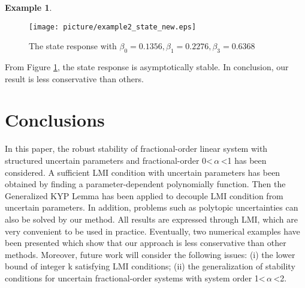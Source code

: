 \documentclass[]{interact}
\theoremstyle{plain}%
\theoremstyle{definition}
\newtheorem{example}[theorem]{Example}
\theoremstyle{remark}
\begin{document}
\begin{example}
    \begin{figure}[H]
    	\centering
    	\texttt{[image: picture/example2\_state\_new.eps]}
    	\caption{The state response with $\beta_0 = 0.1356, \beta_1 = 0.2276, \beta_3 = 0.6368$} 
    	\label{example2_state} 
    \end{figure}
    \par From Figure \ref{example2_state}, the state response is asymptotically stable. In conclusion, our result is less conservative than others.
\end{example}
\section{Conclusions}
\par In this paper, the robust stability of fractional-order linear system with structured uncertain parameters and fractional-order 0\textless\,$\alpha$\,\textless1 has been considered. A sufficient LMI condition with uncertain parameters has been obtained by finding a parameter-dependent polynomially function. Then the Generalized KYP Lemma has been applied to decouple LMI condition from uncertain parameters. In addition, problems such as polytopic uncertainties can also be solved by our method. All results are expressed through LMI, which are very convenient to be used in practice. Eventually, two numerical examples have been presented which show that our approach is less conservative than other methods. Moreover, future work will consider the following issues: (i) the lower bound of integer k satisfying LMI conditions; (ii) the generalization of stability conditions for uncertain fractional-order systems with system order 1\textless\,$\alpha$\,\textless2.  
\end{document}

